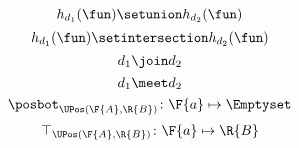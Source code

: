 {\begin{forslides}
        \begin{equation}
            \label{eq:upos_lat_1}
            h_{d_1}(\fun)\setunion h_{d_2}(\fun)
        \end{equation}
        \begin{equation}
            \label{eq:upos_lat_2}
            h_{d_1}(\fun)\setintersection h_{d_2}(\fun)
        \end{equation}
        \begin{equation}
            \label{eq:upos_lat_3}
            d_1\join d_2
        \end{equation}
        \begin{equation}
            \label{eq:upos_lat_4}
            d_1\meet d_2
        \end{equation}
        \begin{equation}
            \label{eq:upos_lat_5}
            \posbot_{\UPos(\F{A},\R{B})}\colon \F{a}\mapsto \Emptyset
        \end{equation}
        \begin{equation}
            \label{eq:upos_lat_6}
            \top_{\UPos(\F{A},\R{B})}\colon \F{a}\mapsto \R{B}
        \end{equation}
    \end{forslides}
}

